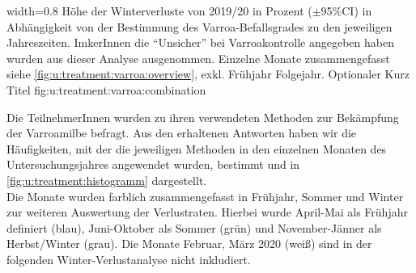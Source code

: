 {width=0.8\textwidth} %
{Höhe der Winterverluste von 2019/20 in Prozent ($\pm$95\%CI) in Abhängigkeit von der Bestimmung des Varroa-Befallsgrades zu den jeweiligen Jahreszeiten. ImkerInnen die \enquote{Unsicher} bei Varroakontrolle angegeben haben wurden aus dieser Analyse ausgenommen. Einzelne Monate zusammengefasst siehe \cref{fig:u:treatment:varroa:overview}, exkl. Frühjahr Folgejahr.} %
{Optionaler Kurz Titel} %
{fig:u:treatment:varroa:combination} %


Die TeilnehmerInnen wurden zu ihren verwendeten Methoden zur Bekämpfung der Varroamilbe befragt. Aus den erhaltenen Antworten haben wir die Häufigkeiten, mit der die jeweiligen Methoden in den einzelnen Monaten des Untersuchungsjahres angewendet wurden, bestimmt und in \cref{fig:u:treatment:histogramm} dargestellt.  \\
Die Monate wurden farblich zusammengefasst in Frühjahr, Sommer und Winter zur weiteren Auswertung der Verlustraten. Hierbei wurde April-Mai als Frühjahr definiert (blau), Juni-Oktober als Sommer (grün) und November-Jänner als Herbst/Winter (grau). Die Monate Februar, März 2020 (weiß) sind in der folgenden Winter-Verlustanalyse nicht inkludiert.

